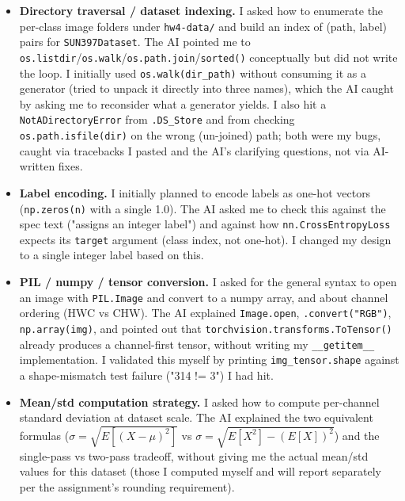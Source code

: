 %   

\begin{itemize}[leftmargin=*]

\item \textbf{Directory traversal / dataset indexing.}
I asked how to enumerate the per-class image folders under \texttt{hw4-data/} and build
an index of (path, label) pairs for \texttt{SUN397Dataset}. The AI pointed me to
\texttt{os.listdir}/\texttt{os.walk}/\texttt{os.path.join}/\texttt{sorted()} conceptually
but did not write the loop. I initially used \texttt{os.walk(dir\_path)} without consuming
it as a generator (tried to unpack it directly into three names), which the AI caught by
asking me to reconsider what a generator yields. I also hit a \texttt{NotADirectoryError}
from \texttt{.DS\_Store} and from checking \texttt{os.path.isfile(dir)} on the wrong
(un-joined) path; both were my bugs, caught via tracebacks I pasted and the AI's
clarifying questions, not via AI-written fixes.

\item \textbf{Label encoding.}
I initially planned to encode labels as one-hot vectors
(\texttt{np.zeros(n)} with a single 1.0). The AI asked me to check this against the spec
text ("assigns an integer label") and against how \texttt{nn.CrossEntropyLoss} expects its
\texttt{target} argument (class index, not one-hot). I changed my design to a single
integer label based on this.

\item \textbf{PIL / numpy / tensor conversion.}
I asked for the general syntax to open an image with \texttt{PIL.Image} and convert to a
numpy array, and about channel ordering (HWC vs CHW). The AI explained
\texttt{Image.open}, \texttt{.convert("RGB")}, \texttt{np.array(img)}, and pointed out that
\texttt{torchvision.transforms.ToTensor()} already produces a channel-first tensor,
without writing my \texttt{\_\_getitem\_\_} implementation. I validated this myself by
printing \texttt{img\_tensor.shape} against a shape-mismatch test failure
("314 != 3") I had hit.

\item \textbf{Mean/std computation strategy.}
I asked how to compute per-channel standard deviation at dataset scale. The AI explained
the two equivalent formulas ($\sigma = \sqrt{E[(X-\mu)^2]}$ vs
$\sigma = \sqrt{E[X^2] - (E[X])^2}$) and the single-pass vs two-pass tradeoff, without
giving me the actual mean/std values for this dataset (those I computed myself and will
report separately per the assignment's rounding requirement).


\end{itemize}

